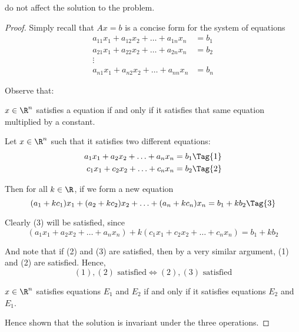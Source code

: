 do not affect the solution to the problem.

\begin{proof}
  Simply recall that $Ax=b$ is a concise form for the system of equations
  \begin{align*}
    a_{11}x_1+a_{12}x_2+\ldots+a_{1n}x_n &=b_1 \\
    a_{21}x_1+a_{22}x_2+\ldots+a_{2n}x_n &=b_2 \\
    \vdots\quad\quad\quad\quad\quad      &     \\
    a_{n1}x_1+a_{n2}x_2+\ldots+a_{nn}x_n &=b_n
  \end{align*}

  Observe that:
  \begin{enumerati}
    \item $x\in\R^n$ satisfies a equation if and only if it satisfies that same
    equation multiplied by a constant.
    \item Let $x\in\R^n$ such that it satisfies two different equations:
    \begin{align*}
      a_1x_1+a_2x_2+\ldots+a_nx_n &=b_1\Tag{1} \\
      c_1x_1+c_2x_2+\ldots+c_nx_n &=b_2\Tag{2}
    \end{align*}

    Then for all $k\in\R$, if we form a new equation
    \begin{equation*}
      (a_1+kc_1)x_1+(a_2+kc_2)x_2+\ldots+(a_n+kc_n)x_n=b_1+kb_2\Tag{3}
    \end{equation*}

    Clearly (3) will be satisfied, since
    $$
      (a_1x_1+a_2x_2+\ldots+a_nx_n)+k(c_1x_1+c_2x_2+\ldots+c_nx_n)=b_1+kb_2
    $$

    And note that if (2) and (3) are satisfied, then by a very similar
    argument, (1) and (2) are satisfied. Hence,
    $$
      (1),(2)\text{ satisfied}\iff(2),(3)\text{ satisfied}
    $$
    \item $x\in\R^n$ satisfies equations $E_1$ and $E_2$ if and only if it
    satisfies equations $E_2$ and $E_1$.
  \end{enumerati}

  Hence shown that the solution is invariant under the three operations.
\end{proof}
